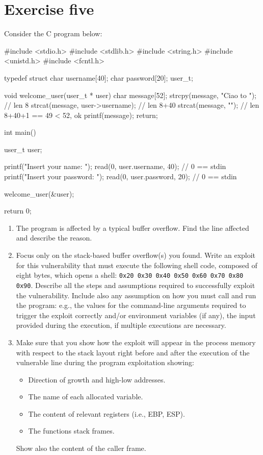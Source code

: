 \section{Exercise five}

Consider the C program below:
\begin{verbnobox}[\verbarg]
#include <stdio.h>
#include <stdlib.h>
#include <string.h>
#include <unistd.h>
#include <fcntl.h>

typedef struct {
    char username[40];
    char password[20];
} user_t;

void welcome_user(user_t * user){
    char message[52];
    strcpy(message, "Ciao to "); // len 8
    strcat(message, user->username); // len 8+40
    strcat(message, "\n"); // len 8+40+1 == 49 < 52, ok
    printf(message);
    return;
}

int main() {
    user_t user;

    printf("Insert your name: ");
    read(0, user.username, 40); // 0 == stdin
    printf("Insert your password: ");
    read(0, user.password, 20); // 0 == stdin

    welcome_user(&user);

return 0;
}
\end{verbnobox}
\begin{enumerate}
    \item The program is affected by a typical buffer overflow. 
        Find the line affected and describe the reason. 
    \item Focus only on the stack-based buffer overflow(s) you found. 
        Write an exploit for this vulnerability that must execute the following shell code, composed of eight bytes, which opens a shell: \texttt{0x20 0x30 0x40 0x50 0x60 0x70 0x80 0x90}.
        Describe all the steps and assumptions required to successfully exploit the vulnerability. 
        Include also any assumption on how you must call and run the program: e.g., the values for the command-line arguments required to trigger the exploit correctly and/or environment variables (if any), the input provided during the execution, if multiple executions are necessary. 
    \item Make sure that you show how the exploit will appear in the process memory with respect to the stack layout right before and after the execution of the vulnerable line during the program exploitation showing:
    \begin{itemize}
        \item Direction of growth and high-low addresses. 
        \item The name of each allocated variable. 
        \item The content of relevant registers (i.e., EBP, ESP). 
        \item The functions stack frames.
    \end{itemize}
    Show also the content of the caller frame. 
\end{enumerate}

